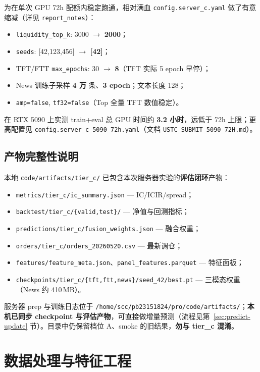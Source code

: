 \documentclass[UTF8,a4paper,12pt]{ctexart}
\begin{document}
为在单次 GPU 72h 配额内稳定跑通，相对满血 \texttt{config.server\_c.yaml} 做了有意缩减（详见 \texttt{report\_notes}）：
\begin{itemize}[leftmargin=2em]
  \item \texttt{liquidity\_top\_k}: 3000 $\to$ \textbf{2000}；
  \item \texttt{seeds}: [42,123,456] $\to$ \textbf{[42]}；
  \item TFT/FTT \texttt{max\_epochs}: 30 $\to$ \textbf{8}（TFT 实际 5 epoch 早停）；
  \item News 训练子采样 \textbf{4 万} 条、\textbf{3 epoch}；文本长度 128；
  \item \texttt{amp=false}, \texttt{tf32=false}（Top 全量 TFT 数值稳定）。
\end{itemize}
在 RTX 5090 上实测 train+eval 总 GPU 时间约 \textbf{3.2 小时}，远低于 72h 上限；更高配置见 \texttt{config.server\_c\_5090\_72h.yaml}（文档 \texttt{USTC\_SUBMIT\_5090\_72H.md}）。

\subsection{产物完整性说明}

本地 \texttt{code/artifacts/tier\_c/} 已包含本次服务器实验的\textbf{评估闭环}产物：
\begin{itemize}[leftmargin=2em]
  \item \texttt{metrics/tier\_c/ic\_summary.json} — IC/ICIR/spread；
  \item \texttt{backtest/tier\_c/\{valid,test\}/} — 净值与回测指标；
  \item \texttt{predictions/tier\_c/fusion\_weights.json} — 融合权重；
  \item \texttt{orders/tier\_c/orders\_20260520.csv} — 最新调仓；
  \item \texttt{features/feature\_meta.json}、\texttt{panel\_features.parquet} — 特征面板；
  \item \texttt{checkpoints/tier\_c/\{tft,ftt,news\}/seed\_42/best.pt} — 三模态权重（News 约 410\,MB）。
\end{itemize}
服务器 prep 与训练日志位于 \texttt{/home/scc/pb23151824/pro/code/artifacts/}；\textbf{本机已同步 checkpoint 与评估产物}，可直接做增量预测（流程见第~\ref{sec:predict-update} 节）。目录中仍保留档位 A、smoke 的旧结果，\textbf{勿与 tier\_c 混淆}。

\section{数据处理与特征工程}
\end{document}
